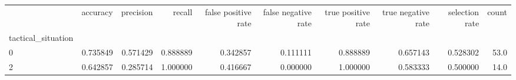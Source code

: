 \begin{tabular}{lrrrrrrrrr}
\toprule
{} &  accuracy &  precision &    recall &  false positive rate &  false negative rate &  true positive rate &  true negative rate &  selection rate &  count \\
tactical\_situation &           &            &           &                      &                      &                     &                     &                 &        \\
\midrule
0                  &  0.735849 &   0.571429 &  0.888889 &             0.342857 &             0.111111 &            0.888889 &            0.657143 &        0.528302 &   53.0 \\
2                  &  0.642857 &   0.285714 &  1.000000 &             0.416667 &             0.000000 &            1.000000 &            0.583333 &        0.500000 &   14.0 \\
\bottomrule
\end{tabular}
